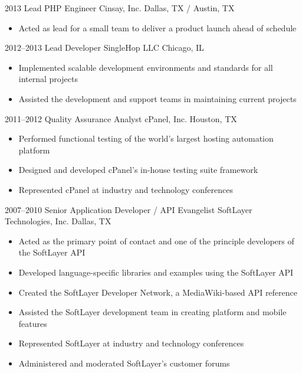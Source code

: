 \documentclass[11pt,a4paper,sans]{moderncv}
\begin{document}
        \cventry
            {2013}
            {Lead PHP Engineer}
            {Cinsay, Inc.}
            {Dallas, TX / Austin, TX}
            {}
            {
                \begin{itemize}
                    \item Acted as lead for a small team to deliver a product launch ahead of schedule
                \end{itemize}
            }

        \cventry
            {2012--2013}
            {Lead Developer}
            {SingleHop LLC}
            {Chicago, IL}
            {}
            {
                \begin{itemize}
                    \item Implemented scalable development environments and standards for all internal projects
                    \item Assisted the development and support teams in maintaining current projects
                \end{itemize}
            }

        \cventry
            {2011--2012}
            {Quality Assurance Analyst}
            {cPanel, Inc.}
            {Houston, TX}
            {}
            {
                \begin{itemize}
                    \item Performed functional testing of the world's largest hosting automation platform
                    \item Designed and developed cPanel's in-house testing suite framework
                    \item Represented cPanel at industry and technology conferences
                \end{itemize}
            }

        \cventry
            {2007--2010}
            {Senior Application Developer / API Evangelist}
            {SoftLayer Technologies, Inc.}
            {Dallas, TX}
            {}
            {
                \begin{itemize}
                    \item Acted as the primary point of contact and one of the principle developers of the SoftLayer API
                    \item Developed language-specific libraries and examples using the SoftLayer API
                    \item Created the SoftLayer Developer Network, a MediaWiki-based API reference
                    \item Assisted the SoftLayer development team in creating platform and mobile features
                    \item Represented SoftLayer at industry and technology conferences
                    \item Administered and moderated SoftLayer's customer forums
                \end{itemize}
            }
\end{document}
